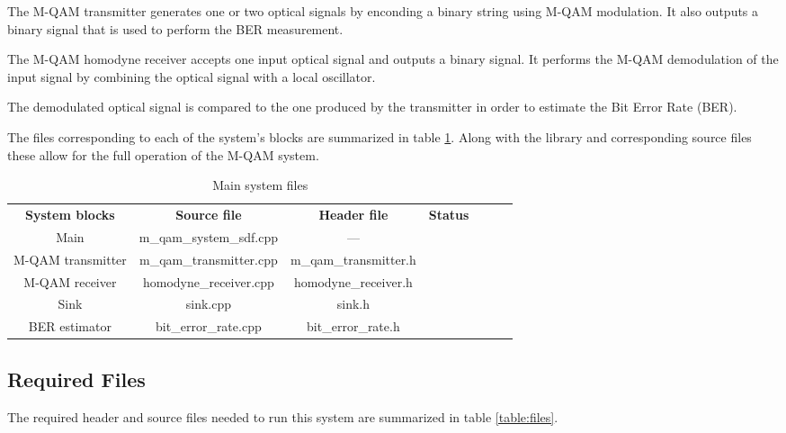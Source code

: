 The M-QAM transmitter generates one or two optical signals by enconding a binary string using M-QAM modulation. It also outputs a binary signal that is used to perform the BER measurement.

The M-QAM homodyne receiver accepts one input optical signal and outputs
a binary signal. It performs the M-QAM demodulation of the input signal by combining the optical signal with a local oscillator.

The demodulated optical signal is compared to the one produced by the transmitter in order to estimate the Bit Error Rate (BER).

The files corresponding to each of the system's blocks are summarized in table \ref{files_table}. Along with the library and corresponding source files these allow for the full operation of the M-QAM system.

\begin{table}[]
	\centering
	\caption{Main system files}
	\begin{tabular}{|c|c|c|c|ccc}
		\cline{1-4}
		\textbf{System blocks} & \textbf{Source file} & \textbf{Header file}  &  \textbf{Status} & \\ \cline{1-4}
		Main & m\_qam\_system\_sdf.cpp & --- & \checkmark & \\ \cline{1-4}
		M-QAM transmitter & m\_qam\_transmitter.cpp & m\_qam\_transmitter.h & \checkmark &  \\ \cline{1-4}
		M-QAM receiver & homodyne\_receiver.cpp & homodyne\_receiver.h & &  \\ \cline{1-4}
		Sink & sink.cpp & sink.h &  \checkmark & \\ \cline{1-4}
		BER estimator & bit\_error\_rate.cpp & bit\_error\_rate.h &  &\\ \cline{1-4}
	\end{tabular}
	\label{files_table}
\end{table}

\subsection*{Required Files}

The required header and source files needed to run this system are summarized in table \ref{table:files}.

